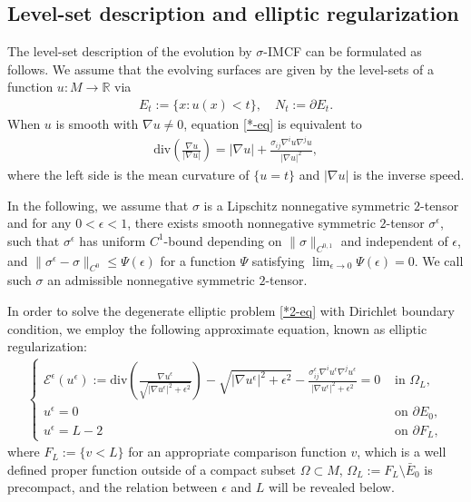 \documentclass[11pt, letterpaper]{amsart}
\theoremstyle{definition}
\theoremstyle{remark}
\begin{document}
\subsection{Level-set description and elliptic regularization}
The level-set description of the evolution by $\sigma $-IMCF can be formulated as follows. We assume that the evolving surfaces are given by the level-sets of a function $u: M \to \mathbb{R}$ via
\begin{align*}
	E_t:= \{ x: u(x) <t\} ,\quad N_t := \partial E_t. 
\end{align*}
When $u$ is smooth with $\nabla u \neq 0$, equation \ref{*-eq} is equivalent to 
\begin{align}\label{*2-eq}
	\mathrm{div}\left( \frac{\nabla u}{|\nabla u|} \right) = |\nabla u| + \frac{\sigma _{ij} \nabla ^{i} u \nabla ^{j}u}{|\nabla u|^2}, \tag*{$(* *)$}
\end{align}
where the left side is the mean curvature of $\{ u = t\} $ and $|\nabla u|$ is the inverse speed.

In the following, we assume that $\sigma $ is a Lipschitz nonnegative symmetric $2$-tensor and for any $0<\epsilon <1$, there exists smooth nonnegative symmetric $2$-tensor $\sigma ^{\epsilon }$, such that $\sigma ^{\epsilon }$ has uniform $C^1$-bound depending on $\|\sigma \|_{C^{0,1}}$ and independent of $\epsilon $, and $\|\sigma ^{\epsilon} - \sigma\|_{C^0} \leq \Psi (\epsilon ) $ for a function $\Psi $ satisfying $\lim_{\epsilon \to 0} \Psi (\epsilon ) =0 $. We call such $\sigma $ an admissible nonnegative symmetric $2$-tensor.




In order to solve the degenerate elliptic problem \ref{*2-eq} with Dirichlet boundary condition, we employ the following approximate equation, known as elliptic regularization:
\begin{align}\label{epsilon-eq}
	\begin{cases}
		\mathcal{E}^{\epsilon } (u^{\epsilon }) := \mathrm{div}\left( \frac{\nabla u ^{\epsilon }}{ \sqrt{|\nabla u^{\epsilon }|^2 + \epsilon ^2} } \right) - \sqrt{|\nabla u^{\epsilon }|^2+ \epsilon ^2} -  \frac{\sigma^{\epsilon } _{ij}\nabla ^{i} u^{\epsilon } \nabla ^{j} u ^{\epsilon }}{|\nabla u^{\epsilon }|^2+ \epsilon ^2} =0 &\text{ in } \Omega _{L},\\
		u ^{\epsilon }=0 &\text{ on } \partial E_0,\\
		u ^{\epsilon }= L-2 & \text{ on } \partial F_{L},
	\end{cases}
	\tag*{ $(*)_\epsilon $}
\end{align}
where $F_{L} := \{ v < L\} $ for an appropriate comparison function $v$, which is a well defined proper function outside of a compact subset $\Omega \subset M$, $\Omega _{L}:= F_{L} \setminus \bar{E}_0$ is precompact, and the relation between $\epsilon $ and $L$ will be revealed below. 
\end{document}
